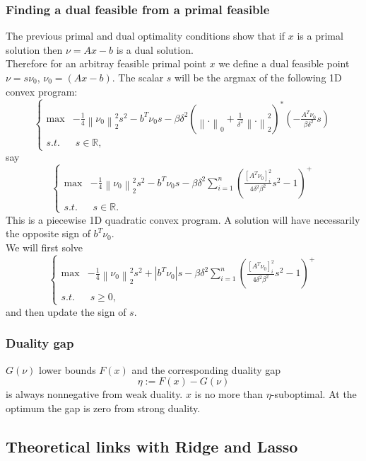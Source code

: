 \documentclass[fleqn]{report} %
\newcommand\ddfrac[2]{\frac{\displaystyle #1}{\displaystyle #2}}
\begin{document}
\subsubsection{Finding a dual feasible from a primal feasible}
The previous primal and dual optimality conditions show that if $x$ is a primal solution then $\nu=Ax-b$ is a dual solution.\\ 
Therefore for an arbitray feasible primal point $x$ we define a dual feasible point $\nu = s\nu_0$,  $\nu_0 = (Ax-b)$. The scalar $s$ will be the argmax of the following 1D convex program:
\[
		\left\{\begin{array}{ll}
\max & -\ddfrac{1}{4}\left\|\nu_0\right\|^2_2 s^2 - b^T\nu_0 s - \beta\delta^2\left(\left\|.\right\|_0 + \ddfrac{1}{\delta^2} \left\|.\right\|_2^2\right)^{*}(-\ddfrac{A^T\nu_0}{\beta\delta^2}s)\\
		s.t.&\;s\in\mathbb{R},
		\end{array} \right.
		\]
say 
\[
		\left\{\begin{array}{ll}
\max & -\ddfrac{1}{4}\left\|\nu_0\right\|^2_2 s^2 - b^T\nu_0 s - \beta\delta^2\sum_{i=1}^{n} \left(\ddfrac{\left[A^T\nu_0\right]_i^2}{4\delta^2\beta^2}s^2 - 1\right)^+\\
		s.t.&\;s\in\mathbb{R}.
		\end{array} \right.
		\]
This is a piecewise 1D quadratic convex program. A solution will have necessarily the opposite sign of $b^T\nu_0$.\\
 We will first solve 
\[
		\left\{\begin{array}{ll}
\max & -\ddfrac{1}{4}\left\|\nu_0\right\|^2_2 s^2 + \left|b^T\nu_0\right| s -  \beta\delta^2\sum_{i=1}^{n} \left(\ddfrac{\left[A^T\nu_0\right]_i^2}{4\delta^2\beta^2}s^2 - 1\right)^+\\
		s.t.&\;s\geq0,
		\end{array} \right.
		\]
and then update the sign of $s$.
\subsubsection{Duality gap}
$G(\nu)$ lower bounds $F(x)$ and the corresponding duality gap
\[
\eta := F(x) - G(\nu)
\]
is always nonnegative from weak duality. $x$ is no more than $\eta$-suboptimal. At the optimum the gap is zero from strong duality.
\subsection{Theoretical links with Ridge and Lasso}
\end{document}
